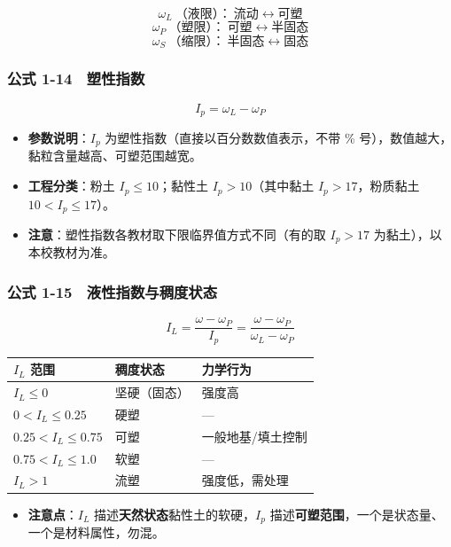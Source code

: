 \documentclass[
]{article}
\newcounter{none} %
\providecommand{\tightlist}{%
  \setlength{\itemsep}{0pt}\setlength{\parskip}{0pt}}
\begin{document}
\[\omega_L\ \text{（液限）：} \ \text{流动}\leftrightarrow\text{可塑}\]
\[\omega_P\ \text{（塑限）：} \ \text{可塑}\leftrightarrow\text{半固态}\]
\[\omega_S\ \text{（缩限）：} \ \text{半固态}\leftrightarrow\text{固态}\]

\subsubsection{公式
1-14　塑性指数}\label{ux516cux5f0f-1-14-ux5851ux6027ux6307ux6570}

\[\boxed{I_p=\omega_L-\omega_P}\]

\begin{itemize}
\tightlist
\item
  \textbf{参数说明}：\(I_p\) 为塑性指数（直接以百分数数值表示，不带 \%
  号），数值越大，黏粒含量越高、可塑范围越宽。
\item
  \textbf{工程分类}：粉土 \(I_p\le10\)；黏性土 \(I_p>10\)（其中黏土
  \(I_p>17\)，粉质黏土 \(10<I_p\le17\)）。
\item
  \textbf{注意}：塑性指数各教材取下限临界值方式不同（有的取 \(I_p>17\)
  为黏土），以本校教材为准。
\end{itemize}

\subsubsection{公式
1-15　液性指数与稠度状态}\label{ux516cux5f0f-1-15-ux6db2ux6027ux6307ux6570ux4e0eux7a20ux5ea6ux72b6ux6001}

\[I_L=\frac{\omega-\omega_P}{I_p}=\frac{\omega-\omega_P}{\omega_L-\omega_P}\]

{\def\LTcaptype{none} %
\begin{longtable}[]{@{}lll@{}}
\toprule\noalign{}
\(I_L\) 范围 & 稠度状态 & 力学行为 \\
\midrule\noalign{}
\endhead
\bottomrule\noalign{}
\endlastfoot
\(I_L\le0\) & 坚硬（固态） & 强度高 \\
\(0<I_L\le0.25\) & 硬塑 & --- \\
\(0.25<I_L\le0.75\) & 可塑 & 一般地基/填土控制 \\
\(0.75<I_L\le1.0\) & 软塑 & --- \\
\(I_L>1\) & 流塑 & 强度低，需处理 \\
\end{longtable}
}

\begin{itemize}
\tightlist
\item
  \textbf{注意点}：\(I_L\) 描述\textbf{天然状态}黏性土的软硬，\(I_p\)
  描述\textbf{可塑范围}，一个是状态量、一个是材料属性，勿混。
\end{itemize}
\end{document}
